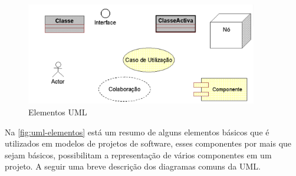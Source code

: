     \begin{figure}[H]
              \caption{\label{fig:uml-elementos}{Elementos UML}}
              \centering
              \includegraphics[width=0.9\textwidth]{Figuras/uml1.PNG}
        \end{figure}
    \par
    Na \autoref{fig:uml-elementos} está um resumo de alguns elementos básicos que é utilizados em modelos de projetos de software, esses componentes por mais que sejam básicos, possibilitam a representação de vários componentes em um projeto. A seguir uma breve descrição dos diagramas comuns da UML.
    

